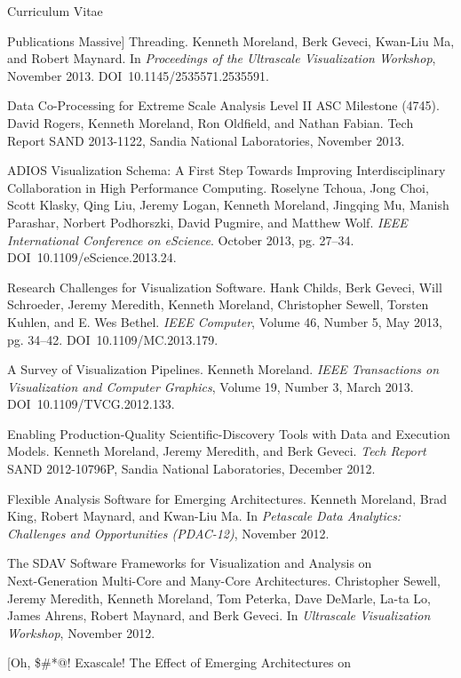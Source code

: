 \documentclass{article}
\begin{document}
\begin{cv}{Curriculum Vitae}
\begin{cvlist}{Publications}
      Massive] Threading. Kenneth Moreland, Berk Geveci, Kwan-Liu Ma, and
      Robert Maynard. In \emph{Proceedings of the Ultrascale Visualization
        Workshop}, November 2013. DOI~10.1145/2535571.2535591.
    \item[Data Co-Processing for Extreme Scale Analysis Level II ASC
      Milestone] (4745). David Rogers, Kenneth Moreland, Ron Oldfield, and
      Nathan Fabian. Tech Report SAND 2013-1122, Sandia National
      Laboratories, November 2013.
    \item[ADIOS Visualization Schema: A First Step Towards Improving]
      Interdisciplinary Collaboration in High Performance Computing.
      Roselyne Tchoua, Jong Choi, Scott Klasky, Qing Liu, Jeremy Logan,
      Kenneth Moreland, Jingqing Mu, Manish Parashar, Norbert Podhorszki,
      David Pugmire, and Matthew Wolf. \emph{IEEE International Conference
        on eScience}. October 2013, pg. 27--34.
      DOI~10.1109/eScience.2013.24.
    \item[Research Challenges for Visualization Software.] Hank Childs, Berk
      Geveci, Will Schroeder, Jeremy Meredith, Kenneth Moreland,
      Christopher Sewell, Torsten Kuhlen, and E. Wes Bethel. \emph{IEEE
        Computer}, Volume 46, Number 5, May 2013, pg. 34--42.
      DOI~10.1109/MC.2013.179.
    \item[A Survey of Visualization Pipelines.] Kenneth
      Moreland. \emph{IEEE Transactions on Visualization and Computer
        Graphics}, Volume 19, Number 3, March 2013.
      DOI~10.1109/TVCG.2012.133.
    \item[Enabling Production-Quality Scientific-Discovery Tools with Data
      and] Execution Models. Kenneth Moreland, Jeremy Meredith, and Berk
      Geveci. \emph{Tech Report} SAND 2012-10796P, Sandia National
      Laboratories, December 2012.
    \item[Flexible Analysis Software for Emerging Architectures.] Kenneth
      Moreland, Brad King, Robert Maynard, and Kwan-Liu Ma. In
      \emph{Petascale Data Analytics: Challenges and Opportunities
        (PDAC-12)}, November 2012.
    \item[The SDAV Software Frameworks for Visualization and Analysis on]~\\
      Next-Generation Multi-Core and Many-Core Architectures. Christopher
      Sewell, Jeremy Meredith, Kenneth Moreland, Tom Peterka, Dave DeMarle,
      La-ta Lo, James Ahrens, Robert Maynard, and Berk Geveci. In
      \emph{Ultrascale Visualization Workshop}, November 2012.
    \item[Oh, \$\#*@!  Exascale!  The Effect of Emerging Architectures on

\end{cvlist}
\end{cv}
\end{document}

